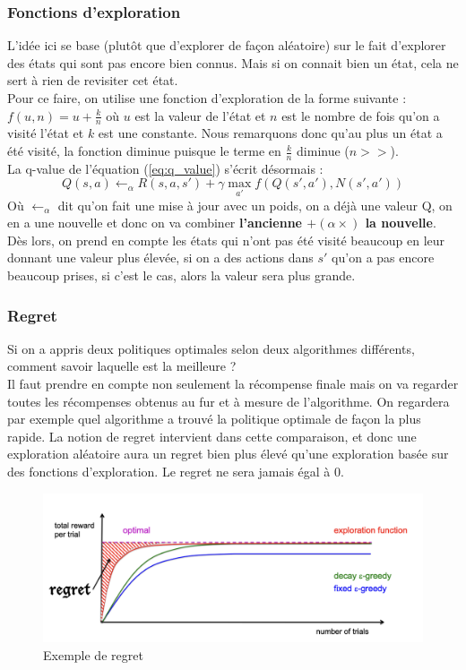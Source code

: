 \subsubsection{Fonctions d'exploration} %
L'idée ici se base (plutôt que d'explorer de façon aléatoire) sur le fait d'explorer des états qui sont pas encore bien connus.
Mais si on connait bien un état, cela ne sert à rien de revisiter cet état.\\
Pour ce faire, on utilise une fonction d'exploration de la forme suivante : $f(u,n)=u+\frac{k}{n}$ où $u$ est la valeur de
l'état et $n$ est le nombre de fois qu'on a visité l'état et $k$ est une constante. Nous remarquons donc qu'au plus un état
a été visité, la fonction diminue puisque le terme en $\frac{k}{n}$ diminue ($n>>$).\\
La q-value de l'équation (\ref{eq:q_value}) s'écrit désormais :
\begin{equation*}
    Q(s,a) \leftarrow_{\alpha} R(s,a,s')+\gamma\max\limits_{a'}f(Q(s',a'),N(s',a'))
\end{equation*}
Où $\leftarrow_{\alpha}$ dit qu'on fait une mise à jour avec un poids, on a déjà une valeur Q, on en a une nouvelle et donc on
va combiner \textbf{l'ancienne $+(\alpha\times)$ la nouvelle}. Dès lors, on prend en compte les états qui n'ont pas été visité
beaucoup en leur donnant une valeur plus élevée, si on a des actions dans $s'$ qu'on a pas encore beaucoup prises, si c'est le
cas, alors la valeur sera plus grande.

\subsubsection{Regret} %
Si on a appris deux politiques optimales selon deux algorithmes différents, comment savoir laquelle est la meilleure ?\\
Il faut prendre en compte non seulement la récompense finale mais on va regarder toutes les récompenses obtenus au fur 
et à mesure de l'algorithme. On regardera par exemple quel algorithme a trouvé la politique optimale de façon la plus rapide.
La notion de regret intervient dans cette comparaison, et donc une exploration aléatoire aura un regret bien plus élevé qu'une
exploration basée sur des fonctions d'exploration. Le regret ne sera jamais égal à 0.
\begin{figure}
    \centering
    \includegraphics[width=0.7\linewidth]{pictures/regret.png}
    \caption{Exemple de regret}
    \label{fig:regret}
\end{figure}

